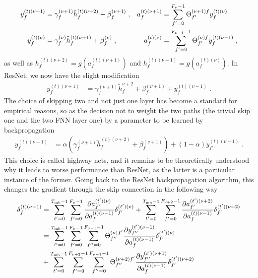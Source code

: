 \begin{subappendices}
\begin{align}
y_{f}^{(t)(\nu+1)}&=\gamma_f^{(\nu+1)}\tilde{h}_f^{(t)(\nu+2)}+\beta_f^{(\nu+1)}\;,&
%
a_{f}^{(t)(\nu+1)}&=\sum^{F_{\nu}-1}_{f'=0}\Theta^{(\nu+1)f}_{f'}y_{f}^{(t)(\nu)}\notag\\
%
y_{f}^{(t)(\nu)}&=\gamma_f^{(\nu)}\tilde{h}_f^{(t)(\nu+1)}+\beta_f^{(\nu)}\;,&
%
a_{f}^{(t)(\nu)}&=\sum^{F_{\nu-1}-1}_{f'=0}\Theta^{(\nu)f}_{f'}y_{f}^{(t)(\nu-1)}\;,
\end{align}
as well as $h^{(t)(\nu+2)}_f=g\left(a_{f}^{(t)(\nu+1)}\right)$ and $h^{(t)(\nu+1)}_f=g\left(a_{f}^{(t)(\nu)}\right)$. In ResNet, we now have the slight modification
\begin{align}
y_{f}^{(t)(\nu+1)}&=\gamma_f^{(\nu+1)}\tilde{h}_f^{\nu+2}+\beta_f^{(\nu+1)}+y^{(t)(\nu-1)}_{f}\;.
\end{align}
The choice of skipping two and not just one layer has become a standard for empirical reasons, so as the decision not to weight the two paths (the trivial skip one and the two FNN layer one) by a parameter to be learned by backpropagation
\begin{align}
y_{f}^{(t)(\nu+1)}&=\alpha\left(\gamma_f^{(\nu+1)}\tilde{h}_f^{(t)(\nu+2)}+\beta_f^{(\nu+1)}\right)
%
+\left( 1-\alpha\right)y^{(t)(\nu-1)}_{f'}\;.
\end{align}
This choice is called highway nets\cite{citeulike:14070430}, and it remains to be theoretically understood why it leads to worse performance than ResNet, as the latter is a particular instance of the former. Going back to the ResNet backpropagation algorithm, this changes the gradient through the skip connection in the following way
\begin{align}
\delta^{(t)(\nu-1)}_f&=
%
\sum_{t'=0}^{T_{{\rm mb}}-1}\sum_{f'=0}^{F_{\nu}-1}
%
 \frac{\partial a_{f'}^{(t')(\nu)}}{\partial a_{f}^{(t)(\nu-1)}} \delta^{(t')(\nu)}_{f'}
+\sum_{t'=0}^{T_{{\rm mb}}-1}\sum_{f'=0}^{F_{\nu+2}-1}
%
 \frac{\partial a_{f'}^{(t')(\nu+2)}}{\partial a_{f}^{(t)(\nu-1)}} \delta^{(t')(\nu+2)}_{f'}\notag\\
%
&=\sum_{t'=0}^{T_{{\rm mb}}-1}\sum_{f'=0}^{F_{\nu}-1}\sum^{F_{\nu-1}-1}_{f''=0}\Theta^{(\nu)f'}_{f''}
%
\frac{\partial y^{(t')(\nu-1)}_{f''} }{\partial a_{f}^{(t)(\nu-1)}} \delta^{(t')(\nu)}_{f'}\notag\\
%
&+\sum_{t'=0}^{T_{{\rm mb}}-1}\sum_{f'=0}^{F_{\nu+2}-1}\sum^{F_{\nu-1}-1}_{f''=0}\Theta^{(\nu+2)f'}_{f''}
%
\frac{\partial y^{(t')(\nu+1)}_{f''} }{\partial a_{f}^{(t)(\nu-1)}} \delta^{(t')(\nu+2)}_{f'}\notag\\

\end{align}
\end{subappendices}

